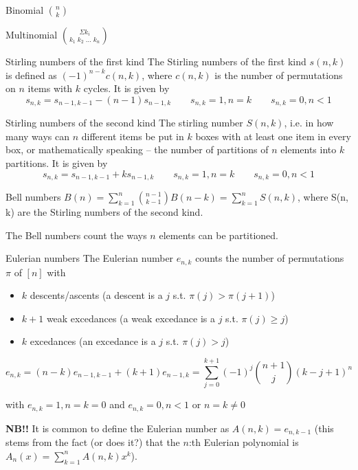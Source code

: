 

\begin{algorithm}{Binomial $\binom{n}{k}$}
\end{algorithm}

\begin{algorithm}{Multinomial $\binom{\Sigma k_i}{k_1\;k_2\;\ldots\;k_n}$}
\end{algorithm}

\begin{algorithm}{Stirling numbers of the first kind}
\desc
The Stirling numbers of the first kind $s(n,k)$ is defined as
$(-1)^{n-k}c(n,k)$, where $c(n,k)$ is the number of permutations on
$n$ items with $k$ cycles. It is given by
$$s_{n,k} = s_{n-1,k-1} - (n-1)s_{n-1,k} \qquad s_{n,k} = 1, n = k \qquad s_{n,k} = 0, n < 1$$
\end{algorithm}

\begin{algorithm}{Stirling numbers of the second kind}
\desc
The stirling number $S(n,k)$, i.e. in how many ways can $n$
different items be put in $k$ boxes with at least one item in every
box, or mathematically speaking -- the number of partitions of $n$
elements into $k$ partitions. It is given by
$$s_{n,k} = s_{n-1,k-1} + ks_{n-1,k} \qquad s_{n,k} = 1, n = k \qquad s_{n,k} = 0, n < 1$$
\end{algorithm}

\begin{algorithm}{Bell numbers}
\desc
$B(n) = \sum_{k=1}^n \binom{n-1}{k-1} B(n-k) = \sum_{k=1}^n S(n,k)$,
where S(n, k) are the Stirling numbers of the second kind.

The Bell numbers count the ways $n$ elements can be partitioned.
\end{algorithm}

\begin{algorithm}{Eulerian numbers}
\desc
The Eulerian number $e_{n,k}$ counts the number of permutations $\pi$
of $[n]$ with
\begin{itemize}
\item $k$ descents/ascents (a descent is a $j$ s.t. $\pi(j) > \pi(j+1)$)
\item $k+1$ weak excedances (a weak excedance is a $j$ s.t. $\pi(j) \ge j$)
\item $k$ excedances (an excedance is a $j$ s.t. $\pi(j) > j$)
\end{itemize}
$$e_{n,k} = (n-k)e_{n-1,k-1} + (k+1) e_{n-1, k} = \sum_{j=0}^{k+1}
(-1)^j \binom{n+1}{j} (k - j + 1)^n$$

with $e_{n,k} = 1, n = k = 0$ and $e_{n,k} = 0, n < 1$ or $n = k \ne 0$

{\bf NB!!} It is common to define the Eulerian number as $A(n,k) =
e_{n,k-1}$ (this stems from the fact (or does it?) that the $n$:th
Eulerian polynomial is $A_n(x) = \sum_{k=1}^{n} A(n,k)x^k$).
\end{algorithm}

